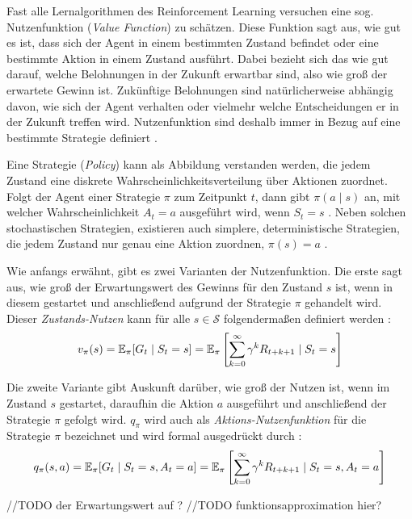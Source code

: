 Fast alle Lernalgorithmen des Reinforcement Learning versuchen eine sog. Nutzenfunktion (\textit{Value Function}) zu schätzen. Diese Funktion sagt aus, \glqq wie gut\grqq{} es ist, dass sich der Agent in einem bestimmten Zustand befindet oder eine bestimmte Aktion in einem Zustand ausführt. Dabei bezieht sich das \glqq wie gut\grqq{} darauf,
welche Belohnungen in der Zukunft erwartbar sind, also wie groß der erwartete Gewinn ist. Zukünftige Belohnungen sind natürlicherweise abhängig davon, wie sich der Agent verhalten oder vielmehr welche Entscheidungen er in der Zukunft treffen wird. Nutzenfunktion sind deshalb immer in Bezug auf eine bestimmte Strategie definiert \cite[S.~58]{Sutton1998}.
\par 
Eine Strategie (\textit{Policy}) kann als Abbildung verstanden werden, die jedem Zustand eine diskrete Wahrscheinlichkeitsverteilung über Aktionen zuordnet. Folgt der Agent einer Strategie $\pi$ zum Zeitpunkt $t$, dann gibt $\pi(a\mid s)$ an, mit welcher Wahrscheinlichkeit $A_t = a$ ausgeführt wird, wenn $S_t = s$ \cite[S.~58]{Sutton1998}. Neben solchen stochastischen Strategien, existieren auch simplere, deterministische Strategien, die jedem Zustand nur genau eine Aktion zuordnen, $\pi (s) = a$ \cite[]{Brunskill}.
\par
Wie anfangs erwähnt, gibt es zwei Varianten der Nutzenfunktion. Die erste sagt aus, wie groß der Erwartungswert des Gewinns für den Zustand $s$ ist, wenn in diesem gestartet und anschließend aufgrund der Strategie $\pi$ gehandelt wird. Dieser \textit{Zustands-Nutzen} kann für alle $s \in \mathcal{S}$ folgendermaßen definiert werden \cite[S.~58]{Sutton1998}:
\begin{equation}\label{eq:valueFunction}
    v_\pi(s) = \operatorname{\mathbb{E}}_\pi[G_t \mid S_t = s] = \operatorname{\mathbb{E}}_\pi \left[\sum_{k=0}^\infty{\gamma^k R_{t+k+1} \mid S_t = s} \right]
\end{equation}

Die zweite Variante gibt Auskunft darüber, wie groß der Nutzen ist, wenn im Zustand $s$ gestartet, daraufhin die Aktion $a$ ausgeführt und anschließend der Strategie $\pi$ gefolgt wird. $q_\pi$ wird auch als \textit{Aktions-Nutzenfunktion} für die Strategie $\pi$ bezeichnet und wird formal ausgedrückt durch \cite[S.~58]{Sutton1998}:
\begin{equation}\label{eq:actionValueFunction}
    q_\pi(s,a) = \operatorname{\mathbb{E}}_\pi[G_t \mid S_t = s, A_t = a] = \operatorname{\mathbb{E}}_\pi\left[\sum_{k=0}^\infty{\gamma^k R_{t+k+1} \mid S_t = s, A_t = a}\right]
\end{equation}

//TODO der Erwartungswert auf ?
//TODO funktionsapproximation hier? 